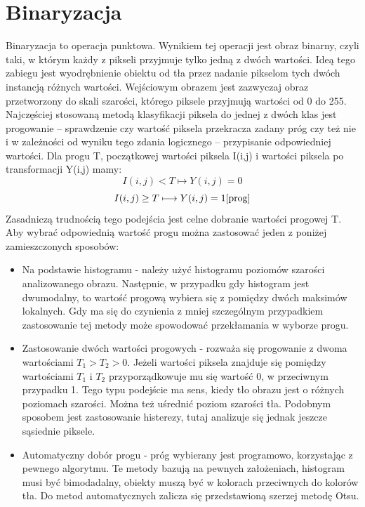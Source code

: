 \documentclass[eng,oneside]{mgr}
\begin{document}
\section{Binaryzacja}
Binaryzacja to operacja punktowa. Wynikiem tej operacji jest obraz binarny, czyli taki, w którym każdy z pikseli przyjmuje tylko jedną z dwóch wartości. Ideą tego zabiegu jest wyodrębnienie obiektu od tła przez nadanie pikselom tych dwóch instancją różnych wartości. Wejściowym obrazem jest zazwyczaj obraz przetworzony do skali szarości, którego piksele przyjmują wartości od 0 do 255. Najczęściej stosowaną metodą klasyfikacji piksela do jednej z dwóch klas jest progowanie – sprawdzenie czy wartość piksela przekracza zadany próg czy też nie i w zależności od wyniku tego zdania logicznego – przypisanie odpowiedniej wartości. Dla progu T, początkowej wartości piksela I(i,j) i wartości piksela po transformacji Y(i,j) mamy:
\begin{equation}
I(i,j) < T \longmapsto Y(i,j) = 0 
\end{equation}
\begin{equation}
I(i,j) \geq T \longmapsto Y(i,j) = 1 \cite{prog}
\end{equation}
Zasadniczą trudnością tego podejścia jest celne dobranie wartości progowej T. Aby wybrać odpowiednią wartość progu można zastosować jeden z poniżej zamieszczonych sposobów:
\begin{itemize}
\item Na podstawie histogramu - należy użyć histogramu poziomów szarości analizowanego obrazu. Następnie, w przypadku gdy histogram jest dwumodalny, to wartość progową wybiera się z pomiędzy dwóch maksimów lokalnych. Gdy ma się do czynienia z mniej szczególnym przypadkiem zastosowanie tej metody może spowodować przekłamania w wyborze progu\cite{histogram}.
\item Zastosowanie dwóch wartości progowych - rozważa się progowanie z dwoma wartościami $T_1 > T_2 > 0$. Jeżeli wartości piksela znajduje się pomiędzy wartościami $T_1$ i $T_2$ przyporządkowuje mu się wartość 0, w przeciwnym przypadku 1. Tego typu podejście ma sens, kiedy tło obrazu jest o różnych poziomach szarości. Można też uśrednić poziom szarości tła. Podobnym sposobem jest zastosowanie histerezy, tutaj analizuje się jednak jeszcze sąsiednie piksele\cite{dwaprogi}. 
\item Automatyczny dobór progu - próg wybierany jest programowo, korzystając z pewnego algorytmu. Te metody bazują na pewnych założeniach, histogram musi być bimodadalny, obiekty muszą być w kolorach przeciwnych do kolorów tła. Do metod automatycznych zalicza się przedstawioną szerzej metodę Otsu\cite{auto}.
\end{itemize}
\end{document}
